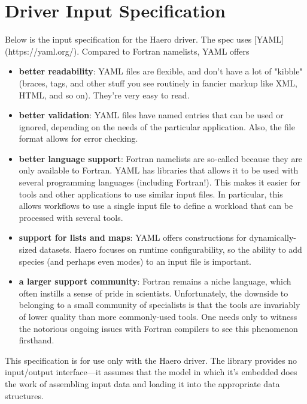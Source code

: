 \chapter{Driver Input Specification}

Below is the input specification for the Haero driver. The spec uses
[YAML](https://yaml.org/). Compared to Fortran namelists, YAML offers

\begin{itemize}
  \item {\bf better readability}: YAML files are flexible, and don't have a lot
    of "kibble" (braces, tags, and other stuff you see routinely in fancier
    markup like XML, HTML, and so on). They're very easy to read.
  \item {\bf better validation}: YAML files have named entries that can be
    used or ignored, depending on the needs of the particular application.
    Also, the file format allows for error checking.
  \item {\bf better language support}: Fortran namelists are so-called because
    they are only available to Fortran. YAML has libraries that allows it to
    be used with several programming languages (including Fortran!). This makes
    it easier for tools and other applications to use similar input files. In
    particular, this allows workflows to use a single input file to define a
    workload that can be processed with several tools.
  \item {\bf support for lists and maps}: YAML offers constructions for
    dynamically-sized datasets. Haero focuses on runtime configurability,
    so the ability to add species (and perhaps even modes) to an input file
    is important.
  \item {\bf a larger support community}: Fortran remains a niche language,
    which often instills a sense of pride in scientists. Unfortunately, the
    downside to belonging to a small community of specialists is that the tools
    are invariably of lower quality than more commonly-used tools. One needs
    only to witness the notorious ongoing issues with Fortran compilers to see
    this phenomenon firsthand.
\end{itemize}

This specification is for use only with the Haero driver. The library provides
no input/output interface---it assumes that the model in which it's embedded
does the work of assembling input data and loading it into the appropriate
data structures.

